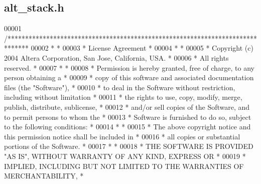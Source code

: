 \subsection{alt\+\_\+stack.\+h}
\label{alt__stack_8h_source}

\begin{DoxyCode}
00001 \textcolor{comment}{/******************************************************************************}
00002 \textcolor{comment}{*                                                                             *}
00003 \textcolor{comment}{* License Agreement                                                           *}
00004 \textcolor{comment}{*                                                                             *}
00005 \textcolor{comment}{* Copyright (c) 2004 Altera Corporation, San Jose, California, USA.           *}
00006 \textcolor{comment}{* All rights reserved.                                                        *}
00007 \textcolor{comment}{*                                                                             *}
00008 \textcolor{comment}{* Permission is hereby granted, free of charge, to any person obtaining a     *}
00009 \textcolor{comment}{* copy of this software and associated documentation files (the "Software"),  *}
00010 \textcolor{comment}{* to deal in the Software without restriction, including without limitation   *}
00011 \textcolor{comment}{* the rights to use, copy, modify, merge, publish, distribute, sublicense,    *}
00012 \textcolor{comment}{* and/or sell copies of the Software, and to permit persons to whom the       *}
00013 \textcolor{comment}{* Software is furnished to do so, subject to the following conditions:        *}
00014 \textcolor{comment}{*                                                                             *}
00015 \textcolor{comment}{* The above copyright notice and this permission notice shall be included in  *}
00016 \textcolor{comment}{* all copies or substantial portions of the Software.                         *}
00017 \textcolor{comment}{*                                                                             *}
00018 \textcolor{comment}{* THE SOFTWARE IS PROVIDED "AS IS", WITHOUT WARRANTY OF ANY KIND, EXPRESS OR  *}
00019 \textcolor{comment}{* IMPLIED, INCLUDING BUT NOT LIMITED TO THE WARRANTIES OF MERCHANTABILITY,    *}

\end{DoxyCode}
